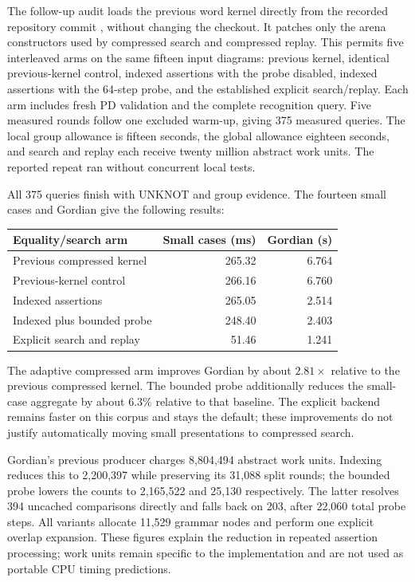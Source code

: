 The follow-up audit loads the previous word kernel directly from the
recorded repository commit
, without changing the
checkout. It patches only the arena constructors used by compressed search
and compressed replay. This permits five interleaved arms on the same
fifteen input diagrams: previous kernel, identical previous-kernel control,
indexed assertions with the probe disabled, indexed assertions with the
64-step probe, and the established explicit search/replay. Each arm includes
fresh PD validation and the complete recognition query. Five measured
rounds follow one excluded warm-up, giving 375 measured queries. The local
group allowance is fifteen seconds, the global allowance eighteen seconds,
and search and replay each receive twenty million abstract work units.
The reported repeat ran without concurrent local tests.

All 375 queries finish with UNKNOT and group evidence. The fourteen small
cases and Gordian give the following results:
\begin{center}
\begin{tabular}{lrr}
\toprule
Equality/search arm & Small cases (ms) & Gordian (s)\\
\midrule
Previous compressed kernel & 265.32 & 6.764\\
Previous-kernel control & 266.16 & 6.760\\
Indexed assertions & 265.05 & 2.514\\
Indexed plus bounded probe & 248.40 & 2.403\\
Explicit search and replay & 51.46 & 1.241\\
\bottomrule
\end{tabular}
\end{center}
The adaptive compressed arm improves Gordian by about $2.81\times$
relative to the previous compressed kernel. The bounded probe additionally
reduces the small-case aggregate by about $6.3\%$ relative to that baseline.
The explicit backend remains faster on this corpus and stays the default;
these improvements do not justify automatically moving small presentations
to compressed search.

Gordian's previous producer charges 8,804,494 abstract work units. Indexing
reduces this to 2,200,397 while preserving its 31,088 split rounds; the
bounded probe lowers the counts to 2,165,522 and 25,130 respectively.
The latter resolves 394 uncached comparisons directly and falls back on
203, after 22,060 total probe steps. All variants allocate 11,529 grammar
nodes and perform one explicit overlap expansion. These figures explain
the reduction in repeated assertion processing; work units remain specific
to the implementation and are not used as portable CPU timing predictions.

